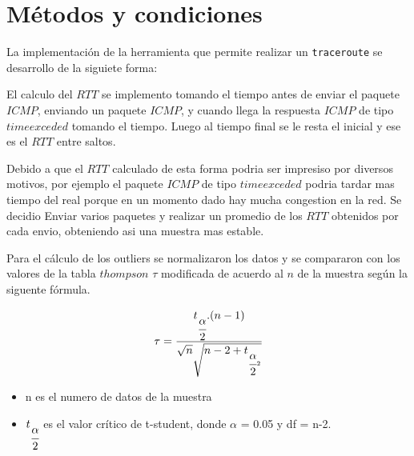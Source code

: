 \section{Métodos y condiciones}
\PARstart La implementaci\'on de la herramienta que permite realizar un \verb+traceroute+ se desarrollo de la siguiete forma:

El calculo del $RTT$ se implemento tomando el tiempo antes de enviar el paquete $ICMP$, enviando un paquete $ICMP$, y cuando llega la respuesta $ICMP$ de tipo $time exceded$ tomando el tiempo. Luego al tiempo final se le resta el inicial y ese es el $RTT$ entre saltos. 

Debido a que el $RTT$ calculado de esta forma podria ser impresiso por diversos motivos, por ejemplo el paquete $ICMP$ de tipo $time exceded$ podria tardar mas tiempo del real porque en un momento dado hay mucha congestion en la red. Se decidio Enviar varios paquetes y realizar un promedio de los $RTT$ obtenidos por cada envio, obteniendo asi una muestra mas estable.

Para el c\'alculo de los outliers se normalizaron los datos y se compararon con los valores de la tabla $thompson$ $\tau$ modificada de acuerdo al $n$ de la muestra según la siguente fórmula.

\begin{equation}
  \tau = \cfrac{t_{\cfrac{\alpha}{2}} . (n - 1)}{\sqrt{n}\sqrt{n-2+t_{\cfrac{\alpha}{2}^2}}}
\end{equation}

\begin{itemize}
\item n es el numero de datos de la muestra
\item $t_{\cfrac{\alpha}{2}}$ es el valor crítico de t-student, donde $\alpha$ = 0.05 y df = n-2.
\end{itemize}

